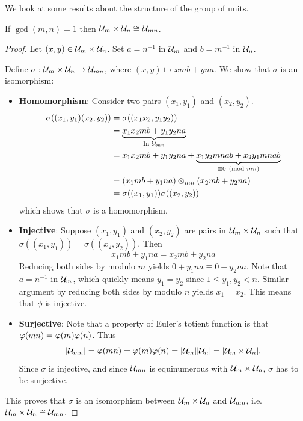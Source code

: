 We look at some results about the structure of the group of units.
\begin{proposition}\label{prop-group-of-units-multiplicative-isomorphism}
    If $\gcd(m, n) = 1$ then $\mathcal{U}_{m} \times \mathcal{U}_{n} \cong \mathcal{U}_{mn}$.
\end{proposition}

\begin{proof}
    Let $(x, y) \in \mathcal{U}_{m} \times \mathcal{U}_{n}$. Set $a = n^{-1}$ in $\mathcal{U}_{m}$ and $b = m^{-1}$ in $\mathcal{U}_{n}$.

    Define $\sigma: \mathcal{U}_{m} \times \mathcal{U}_{n} \to \mathcal{U}_{mn}$, where $(x, y) \mapsto xmb + yna$. We show that $\sigma$ is an isomorphism:
    \begin{itemize}
        \item \textbf{Homomorphism}: Consider two pairs $(x_1, y_1)$ and $(x_2, y_2)$.
            \begin{align*}
                \sigma((x_1, y_1)(x_2, y_2)) &= \sigma((x_1x_2, y_1y_2))\\
                &= \underbrace{x_1x_2mb + y_1y_2na}_{\text{In } \mathcal{U}_{mn}}\\
                &= x_1x_2mb + y_1y_2na + \underbrace{x_1y_2mnab + x_2y_1mnab}_{\equiv 0 \pmod{mn}}\\
                &= (x_1mb + y_1na) \otimes_{mn} (x_2mb + y_2na)\\
                &= \sigma((x_1,y_1))\sigma((x_2,y_2))
            \end{align*}
            which shows that $\sigma$ is a homomorphism.
        \item \textbf{Injective}: Suppose $(x_1, y_1)$ and $(x_2, y_2)$ are pairs in $\mathcal{U}_{m}\times\mathcal{U}_{n}$ such that $\sigma((x_1, y_1)) = \sigma((x_2, y_2))$. Then
        \[
            x_1mb + y_1na = x_2mb + y_2na
        \]
        Reducing both sides by modulo $m$ yields $0 + y_1na \equiv 0 + y_2na$. Note that $a = n^{-1}$ in $\mathcal{U}_{m}$, which quickly means $y_1 = y_2$ since $1 \leq y_1, y_2 < n$. Similar argument by reducing both sides by modulo $n$ yields $x_1 = x_2$. This means that $\phi$ is injective.
        \item \textbf{Surjective}: Note that a property of Euler's totient function is that $\varphi(mn) = \varphi(m)\varphi(n)$. Thus
        \[
            |\mathcal{U}_{mn}| = \varphi(mn) = \varphi(m)\varphi(n) = |\mathcal{U}_{m}||\mathcal{U}_{n}| = |\mathcal{U}_{m} \times \mathcal{U}_{n}|.
        \]
        Since $\sigma$ is injective, and since $\mathcal{U}_{mn}$ is equinumerous with $\mathcal{U}_{m} \times \mathcal{U}_{n}$, $\sigma$ has to be surjective.
    \end{itemize}
    This proves that $\sigma$ is an isomorphism between $\mathcal{U}_{m} \times \mathcal{U}_{n}$ and $\mathcal{U}_{mn}$, i.e. $\mathcal{U}_{m} \times \mathcal{U}_{n} \cong \mathcal{U}_{mn}$.
\end{proof}

